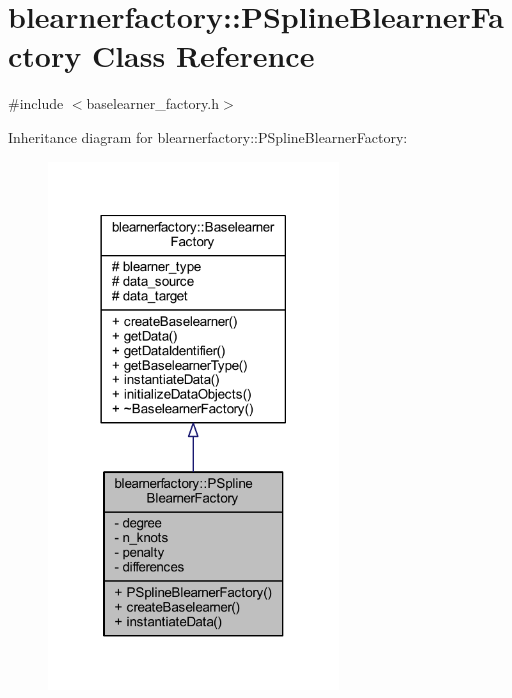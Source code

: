 \hypertarget{classblearnerfactory_1_1_p_spline_blearner_factory}{}\section{blearnerfactory\+:\+:P\+Spline\+Blearner\+Factory Class Reference}
\label{classblearnerfactory_1_1_p_spline_blearner_factory}


{\ttfamily \#include $<$baselearner\+\_\+factory.\+h$>$}



Inheritance diagram for blearnerfactory\+:\+:P\+Spline\+Blearner\+Factory\+:\nopagebreak
\begin{figure}[H]
\begin{center}
\leavevmode
\includegraphics[width=218pt]{classblearnerfactory_1_1_p_spline_blearner_factory__inherit__graph}
\end{center}
\end{figure}


